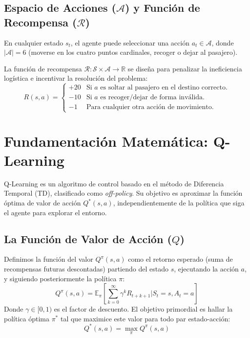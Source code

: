 \documentclass[12pt,a4paper]{article}
\begin{document}
\subsection{Espacio de Acciones ($\mathcal{A}$) y Función de Recompensa ($\mathcal{R}$)}
En cualquier estado $s_t$, el agente puede seleccionar una acción $a_t \in \mathcal{A}$, donde $|\mathcal{A}| = 6$ (moverse en los cuatro puntos cardinales, recoger o dejar al pasajero).

La función de recompensa $\mathcal{R}: \mathcal{S} \times \mathcal{A} \rightarrow \mathbb{R}$ se diseña para penalizar la ineficiencia logística e incentivar la resolución del problema:
\begin{equation}
    R(s, a) = 
    \begin{cases} 
      +20 & \text{Si } a \text{ es soltar al pasajero en el destino correcto.} \\
      -10 & \text{Si } a \text{ es recoger/dejar de forma inválida.} \\
      -1 & \text{Para cualquier otra acción de movimiento.} 
   \end{cases}
\end{equation}

\section{Fundamentación Matemática: Q-Learning}

Q-Learning es un algoritmo de control basado en el método de Diferencia Temporal (TD), clasificado como \textit{off-policy}. Su objetivo es aproximar la función óptima de valor de acción $Q^*(s, a)$, independientemente de la política que siga el agente para explorar el entorno.

\subsection{La Función de Valor de Acción ($Q$)}
Definimos la función del valor $Q^\pi(s, a)$ como el retorno esperado (suma de recompensas futuras descontadas) partiendo del estado $s$, ejecutando la acción $a$, y siguiendo posteriormente la política $\pi$:
\begin{equation}
    Q^\pi(s,a) = \mathbb{E}_\pi \left[ \sum_{k=0}^\infty \gamma^k R_{t+k+1} \bigg| S_t = s, A_t = a \right]
\end{equation}
Donde $\gamma \in [0, 1)$ es el factor de descuento. El objetivo primordial es hallar la política óptima $\pi^*$ tal que maximice este valor para todo par estado-acción:
\begin{equation}
    Q^*(s, a) = \max_{\pi} Q^\pi(s, a)
\end{equation}
\end{document}
